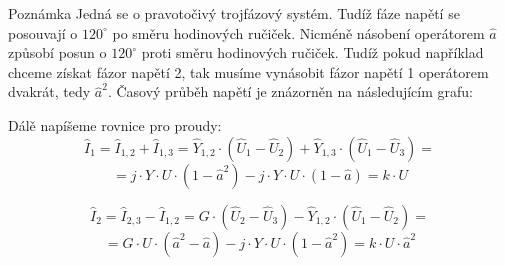 \documentclass{article}
\begin{document}
\begin{notebox}{Poznámka}
    Jedná se o pravotočivý trojfázový systém. Tudíž fáze napětí se posouvají o $120^\circ$ po směru hodinových ručiček. Nicméně násobení operátorem $\hat{a}$ způsobí posun o $120^\circ$ proti směru hodinových ručiček. Tudíž pokud například chceme získat fázor napětí 2, tak musíme vynásobit fázor napětí 1 operátorem dvakrát, tedy $\hat{a}^2$. Časový průběh napětí je znázorněn na následujícím grafu:

    \begin{center}
    \end{center}
\end{notebox}

Dálě napíšeme rovnice pro proudy:
$$
    \hat{I}_1 = \hat{I}_{1,2} + \hat{I}_{1,3} = \hat{Y}_{1,2} \cdot \left( \hat{U}_1 - \hat{U}_2 \right) + \hat{Y}_{1,3} \cdot \left( \hat{U}_1 - \hat{U}_3 \right) =
$$
$$
    = j \cdot Y \cdot U \cdot \left( 1 - \hat{a}^2 \right) - j \cdot Y \cdot U \cdot \left( 1 - \hat{a} \right) = k \cdot U
$$

$$
    \hat{I}_2 = \hat{I}_{2,3} - \hat{I}_{1,2} = G \cdot \left( \hat{U}_2 - \hat{U}_3 \right) - \hat{Y}_{1,2} \cdot \left( \hat{U}_1 - \hat{U}_2 \right) =
$$
$$
    = G \cdot U \cdot \left( \hat{a}^2 - \hat{a} \right) - j \cdot Y \cdot U \cdot \left( 1 - \hat{a}^2 \right) = k \cdot U \cdot \hat{a}^2
$$
\end{document}
